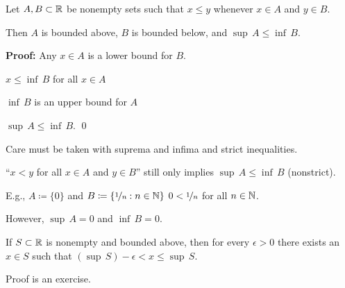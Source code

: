 \documentclass[10pt,aspectratio=169]{beamer}
\begin{document}
\begin{frame}
\begin{proposition}
Let $A, B \subset {\mathbb{R}}$ be nonempty sets such that $x \leq y$ whenever $x \in A$ and
$y \in B$.
\pause

Then $A$ is bounded above, $B$ is bounded below, and $\sup\, A \leq \inf\, B$.
\end{proposition}

\pause

\textbf{Proof:}
Any $x \in A$ is a lower bound for $B$.

\medskip
\pause

\thus \quad
$x \leq \inf\, B$ for all $x \in A$

\medskip
\pause

\thus \quad
$\inf\, B$ is an upper bound for $A$

\medskip
\pause

\thus \quad
$\sup\, A \leq \inf\, B$.
\qed

\bigskip
\pause

Care must be taken with suprema and infima and strict inequalities.

\medskip
\pause

``$x < y$ for all $x \in A$ and $y \in B$''
still only implies $\sup\, A \leq \inf\, B$ (nonstrict).

\medskip
\pause

E.g., $A \coloneqq \{ 0 \}$ and $B \coloneqq \{ \nicefrac{1}{n} : n \in {\mathbb{N}} \}$
\pause
\wthus $0 < \nicefrac{1}{n}$ for all $n \in {\mathbb{N}}$.

\medskip
\pause

However, $\sup\, A = 0$ and $\inf\, B = 0$.
\end{frame}

\begin{frame}


\begin{proposition}
If $S \subset {\mathbb{R}}$ is nonempty and bounded above,
then for every $\epsilon > 0$ there exists an $x \in S$ such
that $(\sup\, S) - \epsilon < x \leq \sup\, S$.
\end{proposition}

\pause

Proof is an exercise.

\end{frame}
\end{document}
